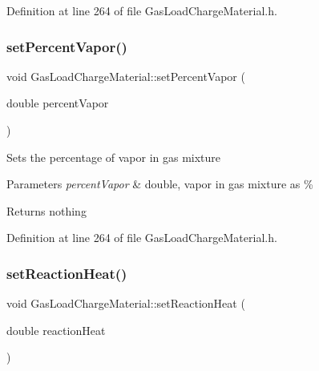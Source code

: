 Definition at line 264 of file Gas\+Load\+Charge\+Material.\+h.

\mbox{\label{class_gas_load_charge_material_acace81e16ef531acb0a68462ab0ed25d}} 
\subsubsection{\texorpdfstring{set\+Percent\+Vapor()}{setPercentVapor()}\hspace{0.1cm}{\footnotesize\ttfamily [3/3]}}
{\footnotesize\ttfamily void Gas\+Load\+Charge\+Material\+::set\+Percent\+Vapor (\begin{DoxyParamCaption}\item[{double}]{percent\+Vapor }\end{DoxyParamCaption})\hspace{0.3cm}{\ttfamily [inline]}}

Sets the percentage of vapor in gas mixture


\begin{DoxyParams}{Parameters}
{\em percent\+Vapor} & double, vapor in gas mixture as \%\\
\hline
\end{DoxyParams}
\begin{DoxyReturn}{Returns}
nothing 
\end{DoxyReturn}


Definition at line 264 of file Gas\+Load\+Charge\+Material.\+h.

\mbox{\label{class_gas_load_charge_material_a721f02cbd0bfbb6ebe67c0da09f0b0f2}} 
\subsubsection{\texorpdfstring{set\+Reaction\+Heat()}{setReactionHeat()}\hspace{0.1cm}{\footnotesize\ttfamily [1/3]}}
{\footnotesize\ttfamily void Gas\+Load\+Charge\+Material\+::set\+Reaction\+Heat (\begin{DoxyParamCaption}\item[{double}]{reaction\+Heat }\end{DoxyParamCaption})\hspace{0.3cm}{\ttfamily [inline]}}

